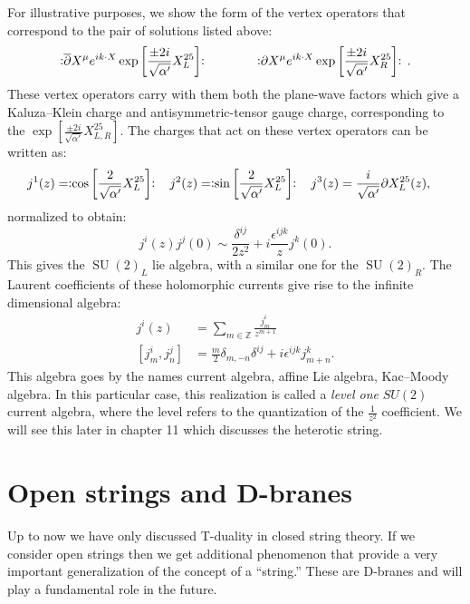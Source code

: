 \documentclass{report}
\theoremstyle{plain}
\theoremstyle{definition}
\theoremstyle{remark}
\newcommand{\FR}[2]{\frac{#1}{#2}}
\newcommand{\di}{\partial}
\newcommand{\NO}[1]{\vcentcolon\mathrel{#1}\vcentcolon\,}
\newcommand{\bZ}{\mathbb{Z}}
\DeclareMathOperator{\SU}{SU}
\begin{document}
For illustrative purposes, we show the form of the vertex operators that
correspond to the pair of solutions listed above: \[
\NO{\overline\di X^\mu e^{ik\cdot X}\exp\left[\FR{\pm2i}{\sqrt{\alpha'}}X^{25}_L\right]}
\qquad\qquad 
\NO{\di X^\mu e^{ik\cdot X}\exp\left[\FR{\pm2i}{\sqrt{\alpha'}} X^{25}_R\right]}.\]
These vertex operators carry with them both the plane-wave factors which
give a Kaluza--Klein charge and antisymmetric-tensor gauge charge,
corresponding to the $\exp\left[\FR{\pm2i}{\sqrt{\alpha'}} X^{25}_{L,R}
\right]$. 
The charges that act on these vertex operators can be written as:
\begin{align*}
    j^1(z) &= \NO{\cos\left[ \FR{2}{\sqrt{\alpha'}}X^{25}_L \right]}
  & j^2(z) &= \NO{\sin\left[ \FR{2}{\sqrt{\alpha'}}X^{25}_L \right]}
  & j^3(z) &= \FR{i}{\sqrt{\alpha'}}\di X^{25}_L(z),
\end{align*}
normalized to obtain:
\[j^i(z)j^j(0)\sim \FR{\delta^{ij}}{2z^2}+i\FR{\epsilon^{ijk}}{z}j^k(0).\]
This gives the $\SU(2)_L$ lie algebra, with a similar one for the
$\SU(2)_R$. The Laurent coefficients of these holomorphic currents give
rise to the infinite dimensional algebra:
\begin{align*}
    j^i(z) &= \sum_{m\in\bZ} \FR{j^i_m}{z^{m+1}}\\
[j^i_m,j^j_n]&= \FR{m}{2}\delta_{m,-n}\delta^{ij}+i\epsilon^{ijk}j^k_{m+n}.
\end{align*}
This algebra goes by the names current algebra, affine Lie algebra,
Kac--Moody algebra. In this particular case, this realization is called a
\emph{level one} $SU(2)$ current algebra, where the level refers to the
quantization of the $\FR{1}{z^2}$ coefficient. We will see this later in
chapter 11 which discusses the heterotic string.

\section{Open strings and D-branes}

Up to now we have only discussed T-duality in closed string theory. If we
consider open strings then we get additional phenomenon that provide a very
important generalization of the concept of a ``string.'' These are D-branes
and will play a fundamental role in the future.
\end{document}

